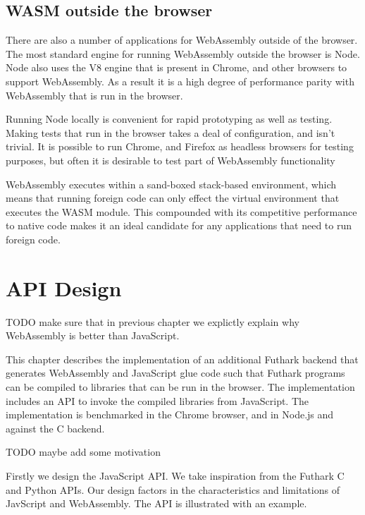 \documentclass[11pt]{book}
\begin{document}
\section{WASM outside the browser}

There are also a number of applications for WebAssembly outside of the browser. The most standard engine for running WebAssembly outside the browser is Node. Node also uses the V8 engine that is present in Chrome, and other browsers to support WebAssembly. As a result it is a high degree of performance parity with WebAssembly that is run in the browser.

Running Node locally is convenient for rapid prototyping as well as testing. Making tests that run in the browser takes a deal of configuration, and isn't trivial. It is possible to run Chrome, and Firefox as headless browsers for testing purposes, but often it is desirable to test part of WebAssembly functionality


WebAssembly executes within a sand-boxed stack-based environment, which means that running foreign code can only effect the virtual environment that executes the WASM module. This compounded with its competitive performance to native code makes it an ideal candidate for any applications that need to run foreign code. 




\chapter{API Design}

TODO make sure that in previous chapter we explictly explain why WebAssembly is better than JavaScript. 



This chapter describes the implementation of an additional Futhark backend that generates WebAssembly and JavaScript glue code such that Futhark programs can be compiled to libraries that can be run in the browser. The implementation includes an API to invoke the compiled libraries from JavaScript. The implementation is benchmarked in the Chrome browser, and in Node.js and against the C backend.

TODO maybe add some motivation

Firstly we design the JavaScript API. We take inspiration from the Futhark C and Python APIs. Our design factors in the characteristics and limitations of JavScript and WebAssembly. The API is illustrated with an example.
\end{document}
